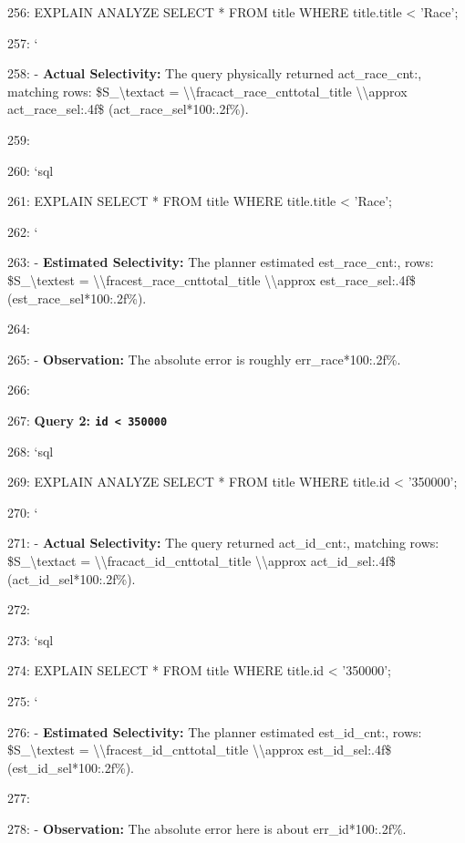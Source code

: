 \documentclass[11pt,a4paper]{article}
\begin{document}
256: EXPLAIN ANALYZE SELECT * FROM title WHERE title.title < 'Race';

257: \texttt{}`

258: - \textbf{Actual Selectivity:} The query physically returned {act\_race\_cnt:,} matching rows: \$S\_{\textbackslash{}text{act}} = \textbackslash{}\textbackslash{}frac{{{act\_race\_cnt}}}{{{total\_title}}} \textbackslash{}\textbackslash{}approx {act\_race\_sel:.4f}\$ ({act\_race\_sel*100:.2f}\%).

259:

260: \texttt{}`sql

261: EXPLAIN SELECT * FROM title WHERE title.title < 'Race';

262: \texttt{}`

263: - \textbf{Estimated Selectivity:} The planner estimated {est\_race\_cnt:,} rows: \$S\_{\textbackslash{}text{est}} = \textbackslash{}\textbackslash{}frac{{{est\_race\_cnt}}}{{{total\_title}}} \textbackslash{}\textbackslash{}approx {est\_race\_sel:.4f}\$ ({est\_race\_sel*100:.2f}\%).

264:

265: - \textbf{Observation:} The absolute error is roughly {err\_race*100:.2f}\%.

266:

267: \textbf{Query 2: \texttt{id < 350000}}

268: \texttt{}`sql

269: EXPLAIN ANALYZE SELECT * FROM title WHERE title.id < '350000';

270: \texttt{}`

271: - \textbf{Actual Selectivity:} The query returned {act\_id\_cnt:,} matching rows: \$S\_{\textbackslash{}text{act}} = \textbackslash{}\textbackslash{}frac{{{act\_id\_cnt}}}{{{total\_title}}} \textbackslash{}\textbackslash{}approx {act\_id\_sel:.4f}\$ ({act\_id\_sel*100:.2f}\%).

272:

273: \texttt{}`sql

274: EXPLAIN SELECT * FROM title WHERE title.id < '350000';

275: \texttt{}`

276: - \textbf{Estimated Selectivity:} The planner estimated {est\_id\_cnt:,} rows: \$S\_{\textbackslash{}text{est}} = \textbackslash{}\textbackslash{}frac{{{est\_id\_cnt}}}{{{total\_title}}} \textbackslash{}\textbackslash{}approx {est\_id\_sel:.4f}\$ ({est\_id\_sel*100:.2f}\%).

277:

278: - \textbf{Observation:} The absolute error here is about {err\_id*100:.2f}\%.
\end{document}
